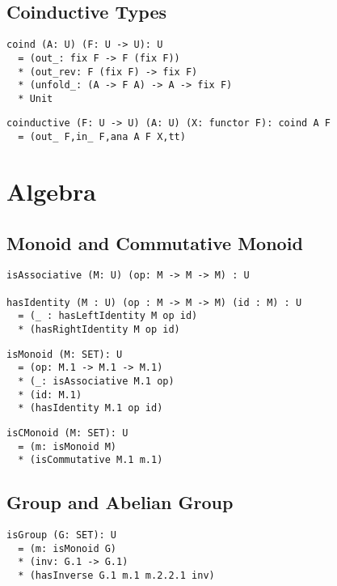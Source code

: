 \documentclass{article}
\begin{document}
\subsection{Coinductive Types}

\begin{lstlisting}[mathescape=true]
coind (A: U) (F: U -> U): U
  = (out_: fix F -> F (fix F))
  * (out_rev: F (fix F) -> fix F)
  * (unfold_: (A -> F A) -> A -> fix F)
  * Unit
\end{lstlisting}

\begin{lstlisting}[mathescape=true]
coinductive (F: U -> U) (A: U) (X: functor F): coind A F
  = (out_ F,in_ F,ana A F X,tt)
\end{lstlisting}


\newpage
\section{Algebra}

\subsection{Monoid and Commutative Monoid}

\begin{lstlisting}[mathescape=true]
isAssociative (M: U) (op: M -> M -> M) : U

hasIdentity (M : U) (op : M -> M -> M) (id : M) : U
  = (_ : hasLeftIdentity M op id)
  * (hasRightIdentity M op id)
\end{lstlisting}

\begin{lstlisting}[mathescape=true]
isMonoid (M: SET): U
  = (op: M.1 -> M.1 -> M.1)
  * (_: isAssociative M.1 op)
  * (id: M.1)
  * (hasIdentity M.1 op id)
\end{lstlisting}

\begin{lstlisting}[mathescape=true]
isCMonoid (M: SET): U
  = (m: isMonoid M)
  * (isCommutative M.1 m.1)
\end{lstlisting}

\subsection{Group and Abelian Group}

\begin{lstlisting}[mathescape=true]
isGroup (G: SET): U
  = (m: isMonoid G)
  * (inv: G.1 -> G.1)
  * (hasInverse G.1 m.1 m.2.2.1 inv)
\end{lstlisting}
\end{document}
